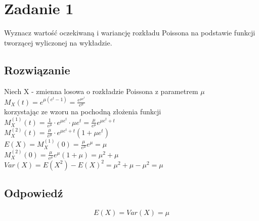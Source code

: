 \section{Zadanie 1}
Wyznacz wartość oczekiwaną i wariancję rozkładu Poissona na podstawie funkcji tworzącej wyliczonej na wykładzie.

\subsection*{Rozwiązanie}
Niech X - zmienna losowa o rozkładzie Poissona z parametrem \(\mu\)\\
\(M_X(t) = e^{\mu (e^t-1)} = \frac{e^{\mu e^t}}{e^\mu}\)\\
korzystając ze wzoru na pochodną złożenia funkcji\\
\(M_X^{(1)}(t) = \frac{1}{e^\mu}\cdot e^{\mu e^t} \cdot \mu e^t = \frac{\mu}{e^\mu} e^{\mu e^t+t}\)\\
\(M_X^{(2)}(t) = \frac{\mu}{e^{\mu}} \cdot e^{\mu e^t + t}(1+\mu e^t)\)\\
\(E(X) = M_X^{(1)}(0) = \frac{\mu}{e^{\mu}}e^{\mu} = \mu\)\\
\(M_X^{(2)}(0) = \frac{\mu}{e^{\mu}} e^{\mu}(1+\mu) = \mu^2+\mu\)\\
\(Var(X) = E(X^2) - E(X)^2 = \mu^2 + \mu - \mu^2 = \mu\)

\subsection*{Odpowiedź}
\[
	\boxed{\text{\(E(X)=Var(X) = \mu\)}}
\]
